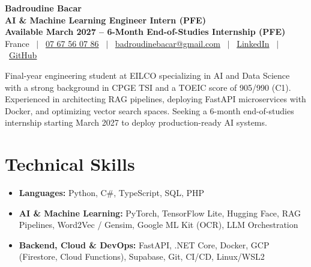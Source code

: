 \documentclass[10pt,a4paper]{article}
\begin{document}
\enlargethispage{3\baselineskip}

\begin{center}
    {\huge \textbf{\color{primary} Badroudine Bacar}} \\[0.2em]
    {\large \textbf{AI \& Machine Learning Engineer Intern (PFE)}} \\[0.2em]
    \textbf{\color{primary} Available March 2027 – 6-Month End-of-Studies Internship (PFE)} \\[0.25em]
    \small
    France \ $|$ \ 
    \href{tel:07 67 56 07 86}{07 67 56 07 86} \ $|$ \ 
    \href{mailto:badroudinebacar@gmail.com}{badroudinebacar@gmail.com} \ $|$ \ 
    \href{https://www.linkedin.com/in/badroudine-bacar/}{LinkedIn} \ $|$ \ 
    \href{https://github.com/Badrouuu}{GitHub}
\end{center}

\vspace{-0.5em}
\noindent
\small Final-year engineering student at EILCO specializing in AI and Data Science with a strong background in CPGE TSI and a TOEIC score of 905/990 (C1). Experienced in architecting RAG pipelines, deploying FastAPI microservices with Docker, and optimizing vector search spaces. Seeking a 6-month end-of-studies internship starting March 2027 to deploy production-ready AI systems.

\section{Technical Skills}
\begin{itemize}
    \item \textbf{Languages:} Python, C\#, TypeScript, SQL, PHP
    \item \textbf{AI \& Machine Learning:} PyTorch, TensorFlow Lite, Hugging Face, RAG Pipelines, Word2Vec / Gensim, Google ML Kit (OCR), LLM Orchestration
    \item \textbf{Backend, Cloud \& DevOps:} FastAPI, .NET Core, Docker, GCP (Firestore, Cloud Functions), Supabase, Git, CI/CD, Linux/WSL2
\end{itemize}

\end{document}
